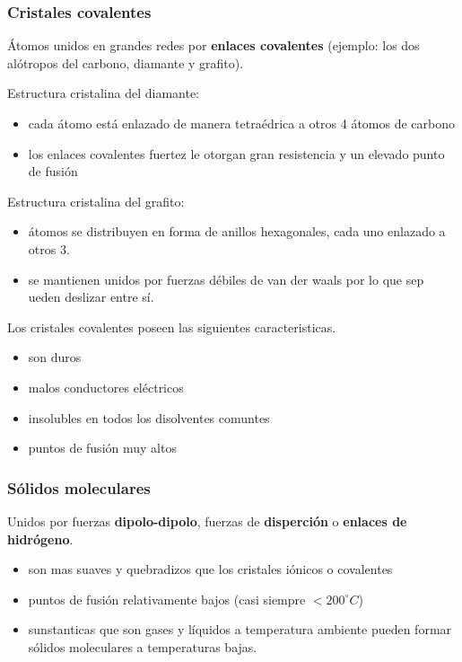 \documentclass[]{article}
\begin{document}
\subsubsection{Cristales covalentes}
Átomos unidos en grandes redes por \textbf{enlaces covalentes} (ejemplo: los dos alótropos del carbono, diamante y grafito).

Estructura cristalina del diamante:

\begin{itemize}
	\item cada átomo está enlazado de manera tetraédrica a otros 4 átomos de carbono
	\item los enlaces covalentes fuertez le otorgan gran resistencia y un elevado punto de fusión
\end{itemize}

Estructura cristalina del grafito:

\begin{itemize}
	\item átomos se distribuyen en forma de anillos hexagonales, cada uno enlazado a otros 3.
	\item se mantienen unidos por fuerzas débiles de van der waals por lo que sep ueden deslizar entre sí.
\end{itemize}

Los cristales covalentes poseen las siguientes caracteristicas.

\begin{itemize}
	\item son duros
	\item malos conductores eléctricos
	\item insolubles en todos los disolventes comuntes
	\item puntos de fusión muy altos
\end{itemize}



\subsubsection{Sólidos moleculares}
Unidos por fuerzas \textbf{dipolo-dipolo}, fuerzas de \textbf{disperción} o \textbf{enlaces de hidrógeno}.

\begin{itemize}
	\item son mas suaves y quebradizos que los cristales iónicos o covalentes
	\item puntos de fusión relativamente bajos (casi siempre $<200^{\circ} C$)
	\item sunstanticas que son gases y líquidos a temperatura ambiente pueden formar sólidos moleculares a temperaturas bajas.
\end{itemize}
\end{document}
